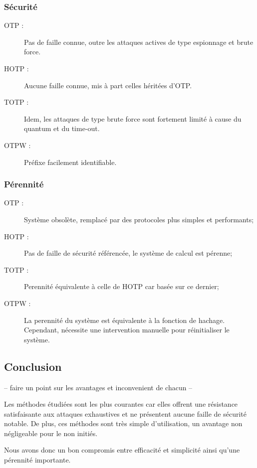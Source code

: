 \subsubsection{Sécurité}

	\begin{description}
		\item[OTP :] Pas de faille connue, outre les attaques actives de type
		espionnage et brute force.
		\item[HOTP :] Aucune faille connue, mis à part celles héritées d'OTP.
		\item[TOTP :] Idem, les attaques de type brute force sont fortement
		limité à cause du quantum et du time-out.
		\item[OTPW :] Préfixe facilement identifiable.
	\end{description}

\subsubsection{Pérennité}

	\begin{description}
		\item[OTP :] Système obsolète, remplacé par des protocoles plus simples
		et performants;
		\item[HOTP :] Pas de faille de sécurité référencée, le système de
		calcul est pérenne;
		\item[TOTP :] Perennité équivalente à celle de HOTP car basée sur ce
		dernier;
		\item[OTPW :] La perennité du système est équivalente à la fonction de
		hachage. Cependant, nécessite une intervention manuelle pour
		réinitialiser le système.
	\end{description}

\subsection{Conclusion}

	-- faire un point sur les avantages et inconvenient de chacun --

	Les méthodes étudiées sont les plus courantes car elles offrent une
	résistance satisfaisante aux attaques exhaustives et ne présentent aucune
	faille de sécurité notable. De plus, ces méthodes sont très simple
	d'utilisation, un avantage non négligeable pour le non initiés.

	Nous avons donc un bon compromis entre efficacité et simplicité ainsi
	qu'une pérennité importante.

